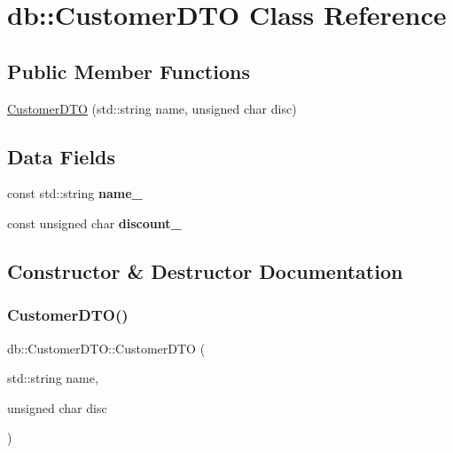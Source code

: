 \hypertarget{classdb_1_1CustomerDTO}{}\section{db\+:\+:Customer\+D\+TO Class Reference}
\label{classdb_1_1CustomerDTO}
\subsection*{Public Member Functions}
\begin{DoxyCompactItemize}
\item 
\mbox{\hyperlink{classdb_1_1CustomerDTO_a80800bb7e919f326404ae1771a52a538}{Customer\+D\+TO}} (std\+::string name, unsigned char disc)
\end{DoxyCompactItemize}
\subsection*{Data Fields}
\begin{DoxyCompactItemize}
\item 
\mbox{\label{classdb_1_1CustomerDTO_af9d6567f7ca24f89a8826fb8e212e6ec}} 
const std\+::string {\bfseries name\+\_\+}
\item 
\mbox{\label{classdb_1_1CustomerDTO_ae0195342bad0687abd41f3c8049ab962}} 
const unsigned char {\bfseries discount\+\_\+}
\end{DoxyCompactItemize}


\subsection{Constructor \& Destructor Documentation}
\mbox{\label{classdb_1_1CustomerDTO_a80800bb7e919f326404ae1771a52a538}} 
\subsubsection{\texorpdfstring{Customer\+D\+T\+O()}{CustomerDTO()}}
{\footnotesize\ttfamily db\+::\+Customer\+D\+T\+O\+::\+Customer\+D\+TO (\begin{DoxyParamCaption}\item[{std\+::string}]{name,  }\item[{unsigned char}]{disc }\end{DoxyParamCaption})\hspace{0.3cm}{\ttfamily [inline]}}

